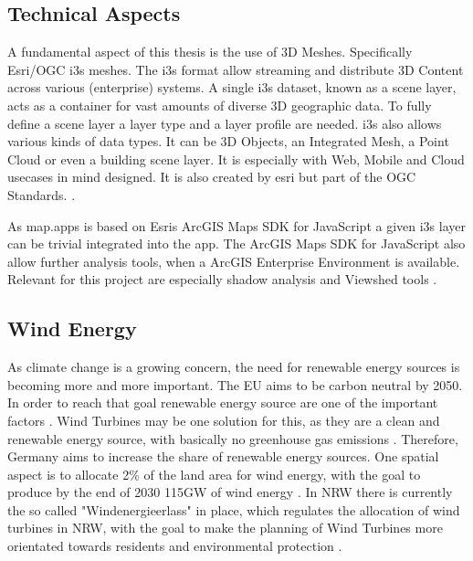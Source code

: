 \documentclass[11pt, titlepage, a4paper]{scrartcl}
\begin{document}
\begin{linenumbers}
    \subsection{Technical Aspects}
    A fundamental aspect of this thesis is the use of 3D Meshes. Specifically Esri/OGC i3s meshes. The i3s format allow streaming and distribute 3D Content across various (enterprise) systems. A single i3s dataset, known as a scene layer, acts as a container for vast amounts of diverse 3D geographic data. To fully define a scene layer a layer type and a layer profile are needed.
    i3s also allows various kinds of data types. It can be 3D Objects, an Integrated Mesh, a Point Cloud or even a building scene layer. It is especially with Web, Mobile and Cloud usecases in mind designed. It is also created by esri but part of the OGC Standards. \cite{esriincI3sspec}.

    As map.apps is based on Esris ArcGIS Maps SDK for JavaScript a given i3s layer can be trivial integrated into the app.
    The ArcGIS Maps SDK for JavaScript also allow further analysis tools, when a ArcGIS Enterprise Environment is available. Relevant for this project are especially shadow analysis \cite{esriincShadowCast} and Viewshed tools \cite{esriincGeoprocessingViewshedAnalysis}.
    \subsection{Wind Energy}
    As climate change is a growing concern, the need for renewable energy sources is becoming more and more important. The EU aims to be carbon neutral by 2050. In order to reach that goal renewable energy source are one of the important factors \cite{europeancommission.directorategeneralforclimateaction.GoingClimateneutral20502019}. Wind Turbines may be one solution for this, as they are a clean and renewable energy source, with basically no greenhouse gas emissions \cite{pryorClimateChangeImpacts2020}.
    Therefore, Germany aims to increase the share of renewable energy sources. One spatial aspect is to allocate 2\% of the land area for wind energy, with the goal to produce by the end of 2030 115GW of wind energy \cite{WindenergieLand}.
    In NRW there is currently the so called "Windenergieerlass" \cite{nrwErlassFurPlanung} in place, which regulates the allocation of wind turbines in NRW, with the goal to make the planning of Wind Turbines more orientated towards residents and environmental protection \cite{fachagenturwindenergieanlandFachagenturWindenergieLand}.


\end{linenumbers}
\end{document}
